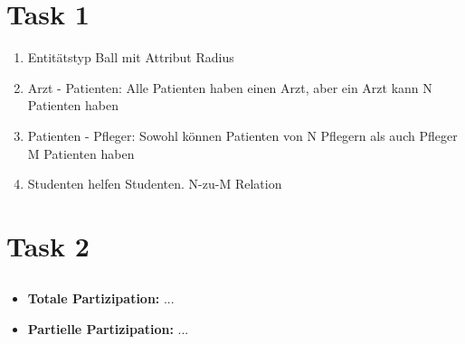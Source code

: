 
\newcommand{\dozent}{Prof. Dr. Agnès Voisard \\ Nicolas Lehmann}					%
\newcommand{\tutor}{Alexander Schulz}						%
\newcommand{\tutoriumNo}{04}				%
\newcommand{\ubungNo}{01}									%
\newcommand{\veranstaltung}{Datenbanksysteme}	%
\newcommand{\semester}{SoSe 18}						%
\newcommand{\studenten}{Eduard Beiline, Mark Niehues, Antoen Oehler}			%





\section{Task 1}
\begin{enumerate}
\item Entitätstyp Ball mit Attribut Radius
\item Arzt - Patienten: Alle Patienten haben einen Arzt, aber ein Arzt kann N Patienten haben
\item Patienten - Pfleger: Sowohl können Patienten von N Pflegern als auch Pfleger M Patienten haben
\item Studenten helfen Studenten. N-zu-M Relation 
\end{enumerate}

\section{Task 2}
\subsection{}
\begin{itemize}
\item \textbf{Totale Partizipation:} ...
\item \textbf{Partielle Partizipation:} ...
\end{itemize}

